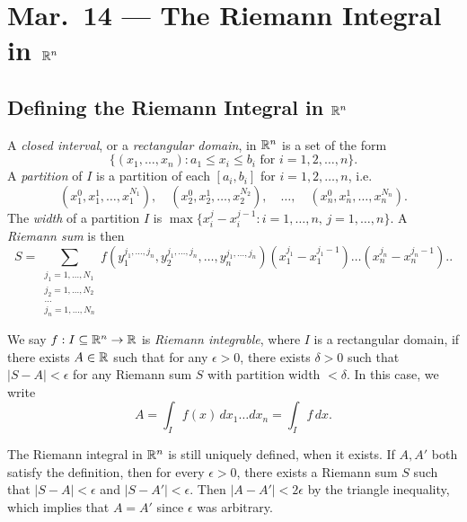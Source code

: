 \chapter{Mar.~14 --- The Riemann Integral in \texorpdfstring{$\mathbb{R}^n$}{Rn}}

\section{Defining the Riemann Integral in \texorpdfstring{$\mathbb{R}^n$}{Rn}}

\begin{definition}
  A \emph{closed interval}, or a \emph{rectangular domain},
  in $\mathbb{R}^n$ is a set of the form
  \[
    \{
      (x_1, \dots, x_n) : a_1 \le x_i \le b_i \text{ for } i = 1, 2, \dots, n
    \}.
  \]
  A \emph{partition} of $I$ is a partition of each
  $[a_i, b_i]$ for $i = 1, 2, \dots, n$, i.e.
  \[
    (x_1^0, x_1^1, \dots, x_1^{N_1}), \quad (x_2^0, x_2^1, \dots, x_2^{N_2}), \quad \dots, \quad (x_n^0, x_n^1, \dots, x_n^{N_n}).
  \]
  The \emph{width} of a partition $I$ is
  $\max\{x_i^{j} - x_{i}^{j - 1} : i = 1, \dots, n,\, j = 1, \dots, n\}$. A \emph{Riemann sum} is then
  \[
    S = \sum_{\substack{j_1 = 1, \dots, N_1 \\ j_2 = 1, \dots, N_2 \\ \dots \\ j_n = 1, \dots , N_n}} f(y_1^{j_1, \dots, j_n}, y_2^{j_1, \dots, j_n}, \dots, y_n^{j_1, \dots, j_n}) (x_1^{j_1} - x_1^{j_1 - 1}) \dots (x_n^{j_n} - x_n^{j_n - 1}).
  .\]
\end{definition}

\begin{definition}
  We say $f : I \subseteq \mathbb{R}^n \to \mathbb{R}$ is \emph{Riemann integrable}, where $I$ is a rectangular domain,
  if there exists $A \in \mathbb{R}$ such that for any
  $\epsilon > 0$, there exists $\delta > 0$ such that
  $|S - A| < \epsilon$ for any Riemann sum $S$ with partition
  width $< \delta$. In this case, we write
  \[
    A = \int_{I} f(x)\, dx_{1} \dots dx_{n}
    = \int_{I} f\, dx.
  \]
\end{definition}

\begin{remark}
  The Riemann integral in $\mathbb{R}^n$ is still uniquely defined,
  when it exists. If $A, A'$ both satisfy the definition,
  then for every $\epsilon > 0$, there exists a Riemann
  sum $S$ such that $|S - A| < \epsilon$ and $|S - A'| < \epsilon$.
  Then
  $|A - A'| < 2 \epsilon$ by the triangle inequality,
  which implies that
  $A = A'$ since $\epsilon$ was arbitrary.
\end{remark}

